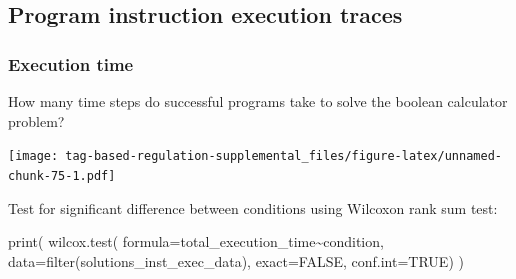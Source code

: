 \documentclass[
]{book}
\newenvironment{Shaded}{\begin{snugshade}}{\end{snugshade}}
\newcommand{\AttributeTok}[1]{\textcolor[rgb]{0.77,0.63,0.00}{#1}}
\newcommand{\CommentTok}[1]{\textcolor[rgb]{0.56,0.35,0.01}{\textit{#1}}}
\newcommand{\ConstantTok}[1]{\textcolor[rgb]{0.00,0.00,0.00}{#1}}
\newcommand{\FloatTok}[1]{\textcolor[rgb]{0.00,0.00,0.81}{#1}}
\newcommand{\FunctionTok}[1]{\textcolor[rgb]{0.00,0.00,0.00}{#1}}
\newcommand{\NormalTok}[1]{#1}
\newcommand{\OtherTok}[1]{\textcolor[rgb]{0.56,0.35,0.01}{#1}}
\newcommand{\SpecialCharTok}[1]{\textcolor[rgb]{0.00,0.00,0.00}{#1}}
\newcommand{\StringTok}[1]{\textcolor[rgb]{0.31,0.60,0.02}{#1}}
\begin{document}
\hypertarget{program-instruction-execution-traces-2}{%
\subsection{Program instruction execution traces}\label{program-instruction-execution-traces-2}}

\hypertarget{execution-time-2}{%
\subsubsection{Execution time}\label{execution-time-2}}

How many time steps do successful programs take to solve the boolean calculator problem?

\begin{Shaded}
\end{Shaded}

\texttt{[image: tag-based-regulation-supplemental\_files/figure-latex/unnamed-chunk-75-1.pdf]}

Test for significant difference between conditions using Wilcoxon rank sum test:

\begin{Shaded}
\begin{Highlighting}[]
\FunctionTok{print}\NormalTok{(}
  \FunctionTok{wilcox.test}\NormalTok{(}
    \AttributeTok{formula=}\NormalTok{total\_execution\_time}\SpecialCharTok{\textasciitilde{}}\NormalTok{condition,}
    \AttributeTok{data=}\FunctionTok{filter}\NormalTok{(solutions\_inst\_exec\_data),}
    \AttributeTok{exact=}\ConstantTok{FALSE}\NormalTok{,}
    \AttributeTok{conf.int=}\ConstantTok{TRUE}\NormalTok{)}
\NormalTok{)}
\end{Highlighting}
\end{Shaded}
\end{document}
